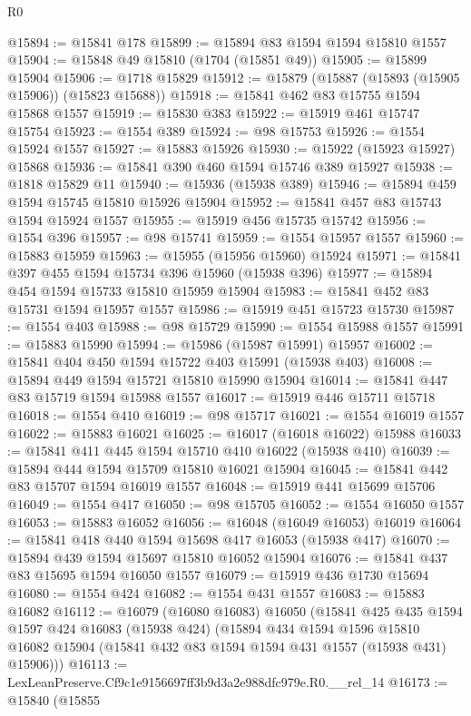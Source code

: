 \begin{lexlean}{R0}
\begin{coremodule}
@15894 := @15841 @178
@15899 := @15894 @83 @1594 @1594 @15810 @1557
@15904 := @15848 @49 @15810 (@1704 (@15851 @49))
@15905 := @15899 @15904
@15906 := @1718 @15829
@15912 := @15879 (@15887 (@15893 (@15905 @15906)) (@15823 @15688))
@15918 := @15841 @462 @83 @15755 @1594 @15868 @1557
@15919 := @15830 @383
@15922 := @15919 @461 @15747 @15754
@15923 := @1554 @389
@15924 := @98 @15753
@15926 := @1554 @15924 @1557
@15927 := @15883 @15926
@15930 := @15922 (@15923 @15927) @15868
@15936 := @15841 @390 @460 @1594 @15746 @389 @15927
@15938 := @1818 @15829 @11
@15940 := @15936 (@15938 @389)
@15946 := @15894 @459 @1594 @15745 @15810 @15926 @15904
@15952 := @15841 @457 @83 @15743 @1594 @15924 @1557
@15955 := @15919 @456 @15735 @15742
@15956 := @1554 @396
@15957 := @98 @15741
@15959 := @1554 @15957 @1557
@15960 := @15883 @15959
@15963 := @15955 (@15956 @15960) @15924
@15971 := @15841 @397 @455 @1594 @15734 @396 @15960 (@15938 @396)
@15977 := @15894 @454 @1594 @15733 @15810 @15959 @15904
@15983 := @15841 @452 @83 @15731 @1594 @15957 @1557
@15986 := @15919 @451 @15723 @15730
@15987 := @1554 @403
@15988 := @98 @15729
@15990 := @1554 @15988 @1557
@15991 := @15883 @15990
@15994 := @15986 (@15987 @15991) @15957
@16002 := @15841 @404 @450 @1594 @15722 @403 @15991 (@15938 @403)
@16008 := @15894 @449 @1594 @15721 @15810 @15990 @15904
@16014 := @15841 @447 @83 @15719 @1594 @15988 @1557
@16017 := @15919 @446 @15711 @15718
@16018 := @1554 @410
@16019 := @98 @15717
@16021 := @1554 @16019 @1557
@16022 := @15883 @16021
@16025 := @16017 (@16018 @16022) @15988
@16033 := @15841 @411 @445 @1594 @15710 @410 @16022 (@15938 @410)
@16039 := @15894 @444 @1594 @15709 @15810 @16021 @15904
@16045 := @15841 @442 @83 @15707 @1594 @16019 @1557
@16048 := @15919 @441 @15699 @15706
@16049 := @1554 @417
@16050 := @98 @15705
@16052 := @1554 @16050 @1557
@16053 := @15883 @16052
@16056 := @16048 (@16049 @16053) @16019
@16064 := @15841 @418 @440 @1594 @15698 @417 @16053 (@15938 @417)
@16070 := @15894 @439 @1594 @15697 @15810 @16052 @15904
@16076 := @15841 @437 @83 @15695 @1594 @16050 @1557
@16079 := @15919 @436 @1730 @15694
@16080 := @1554 @424
@16082 := @1554 @431 @1557
@16083 := @15883 @16082
@16112 := @16079
    (@16080 @16083)
    @16050
    (@15841
      @425
      @435
      @1594
      @1597
      @424
      @16083
      (@15938 @424)
      (@15894
        @434
        @1594
        @1596
        @15810
        @16082
        @15904
        (@15841 @432 @83 @1594 @1594 @431 @1557 (@15938 @431) @15906)))
@16113 := LexLeanPreserve.Cf9c1e9156697ff3b9d3a2e988dfc979e.R0.__rel_14
@16173 := @15840
    (@15855

\end{coremodule}
\end{lexlean}
